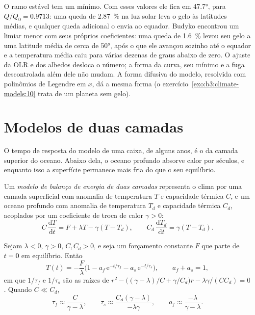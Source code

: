 
O ramo estável tem um mínimo. Com esses valores ele fica em \ang{47.7},
para $Q/Q_0 = \num{0.9713}$: uma queda de \qty{2.87}{\percent} na luz solar
leva o gelo às latitudes médias, e qualquer queda adicional o envia
ao equador. Budyko encontrou um limiar menor com seus próprios coeficientes: uma
queda de \qty{1.6}{\percent} levou seu gelo a uma latitude média de cerca de
\ang{50}, após o que ele avançou sozinho até o equador e a
temperatura média caiu para várias dezenas de graus abaixo de zero. O ajuste da OLR
e dos albedos desloca o número; a forma da curva, seu mínimo e a
fuga descontrolada além dele não mudam. A forma difusiva do modelo, resolvida com
polinômios de Legendre em $x$, dá a mesma forma (o exercício~\ref{exo:b3:climate-models:10}
trata de um planeta sem gelo).

\section{Modelos de duas camadas}\label{sec:b3:climate-models:two-layer}

O tempo de resposta do modelo de uma caixa, de alguns anos, é o da camada
superior do oceano. Abaixo dela, o oceano profundo absorve calor por séculos, e
enquanto isso a superfície permanece mais fria do que o seu equilíbrio.

\begin{definition}\label{def:b3:climate-models:two-layer}
Um \emph{modelo de balanço de energia de duas camadas}
representa o clima por uma camada superficial com anomalia de temperatura $T$
e capacidade térmica $C$, e um oceano profundo com anomalia de temperatura $T_d$ e
capacidade térmica $C_d$, acoplados por um coeficiente de troca de calor $\gamma > 0$:
\[
C\,\frac{\mathrm dT}{\mathrm dt} = F + \lambda T - \gamma(T - T_d), \qquad
C_d\,\frac{\mathrm dT_d}{\mathrm dt} = \gamma(T - T_d) .
\]
\end{definition}

\begin{theorem}\label{thm:b3:climate-models:two-layer}
Sejam $\lambda < 0$, $\gamma > 0$, $C, C_d > 0$, e seja um forçamento constante
$F$ que parte de $t = 0$ em equilíbrio. Então
\[
T(t) = -\frac{F}{\lambda}\Big(1 - a_f\,\mathrm e^{-t/\tau_f} - a_s\,\mathrm
e^{-t/\tau_s}\Big), \qquad a_f + a_s = 1 ,
\]
em que $1/\tau_f$ e $1/\tau_s$ são as raízes de $r^2 - \big((\gamma -
\lambda)/C + \gamma/C_d\big)r - \lambda\gamma/(CC_d) = 0$. Quando $C \ll C_d$,
\[
\tau_f \approx \frac{C}{\gamma - \lambda}, \qquad
\tau_s \approx \frac{C_d(\gamma - \lambda)}{-\lambda\gamma}, \qquad
a_f \approx \frac{-\lambda}{\gamma - \lambda} .
\]
\end{theorem}

